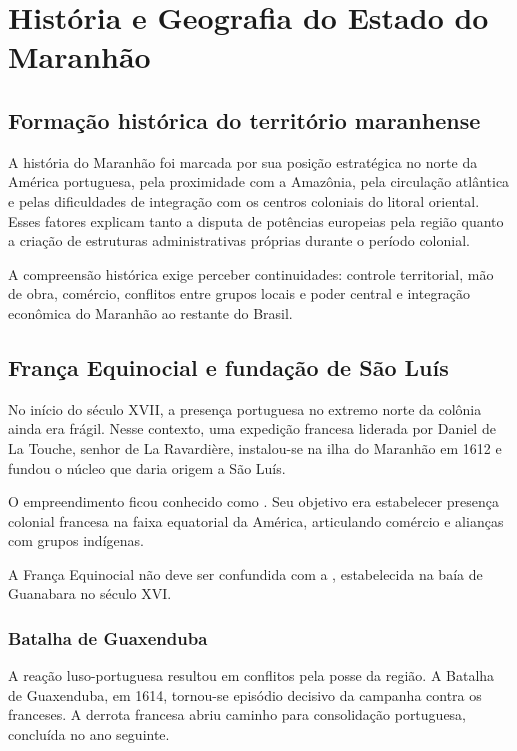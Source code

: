 \chapter{História e Geografia do Estado do Maranhão}

\section{Formação histórica do território maranhense}

A história do Maranhão foi marcada por sua posição estratégica no norte da América portuguesa, pela proximidade com a Amazônia, pela circulação atlântica e pelas dificuldades de integração com os centros coloniais do litoral oriental. Esses fatores explicam tanto a disputa de potências europeias pela região quanto a criação de estruturas administrativas próprias durante o período colonial.

A compreensão histórica exige perceber continuidades: controle territorial, mão de obra, comércio, conflitos entre grupos locais e poder central e integração econômica do Maranhão ao restante do Brasil.

\section{França Equinocial e fundação de São Luís}

No início do século XVII, a presença portuguesa no extremo norte da colônia ainda era frágil. Nesse contexto, uma expedição francesa liderada por Daniel de La Touche, senhor de La Ravardière, instalou-se na ilha do Maranhão em 1612 e fundou o núcleo que daria origem a São Luís.

O empreendimento ficou conhecido como . Seu objetivo era estabelecer presença colonial francesa na faixa equatorial da América, articulando comércio e alianças com grupos indígenas.

A França Equinocial não deve ser confundida com a , estabelecida na baía de Guanabara no século XVI.

\subsection{Batalha de Guaxenduba}

A reação luso-portuguesa resultou em conflitos pela posse da região. A Batalha de Guaxenduba, em 1614, tornou-se episódio decisivo da campanha contra os franceses. A derrota francesa abriu caminho para consolidação portuguesa, concluída no ano seguinte.

